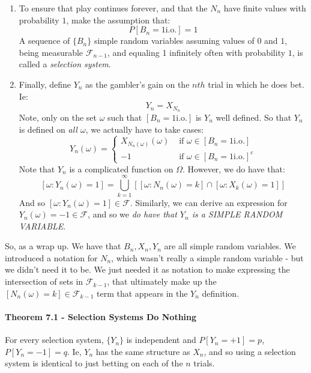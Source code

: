 \documentclass[12pt,a4paper]{article}
\newcommand{\1}[1]{\mathbbm{1}\left\{ #1 \right\}}
\newcommand{\fcal}{\mathcal{F}}
\newcommand{\io}{\text{i.o.}}
\begin{document}
\begin{enumerate}
	\item To ensure that play continues forever, and that the $N_n$ have finite values with probability $1$, make the assumption that:
	$$
		P[B_n = 1 \io] = 1
	$$
	A sequence of $\{B_n\}$ simple random variables assuming values of $0$ and $1$, being measurable $\fcal_{n-1}$, and equaling 1 infinitely often with probability $1$, is called a \textit{selection system}.
	
	\item Finally, define $Y_n$ as the gambler's gain on the $nth$ trial in which he does bet. Ie:
	$$
		Y_n = X_{N_n}
	$$
	Note, only on the set $\omega$ such that $[B_n = 1 \io]$ is $Y_n$ well defined. So that $Y_n$ is defined on \textit{all $\omega$}, we actually have to take cases:
	$$
		Y_n(\omega) = \begin{cases}
		X_{N_n(\omega)}(\omega) & \text{ if $\omega \in [B_n = 1\io]$}\\
		-1 & \text{ if $\omega \in [B_n = 1 \io]^c$}
		\end{cases}
	$$
	Note that $Y_n$ is a complicated function on $\Omega$. However, we do have that:
	$$
		\left[\omega : Y_n(\omega) = 1\right] = 
		\bigcup_{k=1}^\infty \left[\left[\omega: N_n(\omega) = k\right] \cap \left[\omega: X_k(\omega) = 1\right]\right]
	$$
	And so $\left[\omega : Y_n(\omega) = 1\right] \in \fcal$. Similarly, we can derive an expression for $Y_n(\omega) = -1 \in \fcal$, and so we \textit{do have that $Y_n$ is a SIMPLE RANDOM VARIABLE}.
\end{enumerate}
So, as a wrap up. We have that $B_n, X_n, Y_n$ are all simple random variables. We introduced a notation for $N_n$, which wasn't really a simple random variable - but we didn't need it to be. We just needed it as notation to make expressing the intersection of sets in $\fcal_{k-1}$, that ultimately make up the $[N_n(\omega) = k] \in \fcal_{k-1}$ term that appears in the $Y_n$ definition. 

\paragraph{Theorem 7.1 - Selection Systems Do Nothing} For every selection system, $\{Y_n\}$ is independent and $P[Y_n = +1] = p$, $P[Y_n = -1] = q$. Ie, $Y_n$ has the same structure as $X_n$, and so using a selection system is identical to just betting on each of the $n$ trials.
\end{document}
